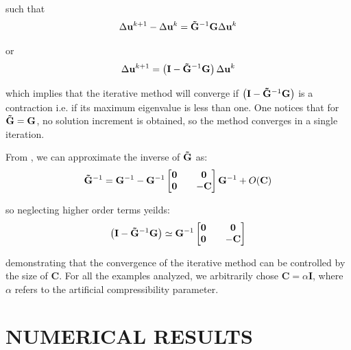 \documentclass{wccm2024}
\begin{document}
\noindent such that
\vskip -0.3cm
\begin{equation}
    \Delta\mathbf{u}^{k+1} - \Delta\mathbf{u}^{k} = \mathbf{\Tilde{G}}^{-1} \mathbf{G} \Delta\mathbf{u}^{k}
\end{equation}

\noindent or
\vskip -0.3cm
\begin{equation}
    \Delta\mathbf{u}^{k+1} = \left( \mathbf{I} - \mathbf{\Tilde{G}}^{-1} \mathbf{G} \right) \Delta\mathbf{u}^{k}
\end{equation}

\noindent which implies that the iterative method will converge if $\left( \mathbf{I} - \mathbf{\Tilde{G}}^{-1} \mathbf{G} \right)$ is a contraction i.e. if its maximum eigenvalue is less than one. One notices that for $\mathbf{\Tilde{G}} = \mathbf{G}$, no solution increment is obtained, so the method converges in a single iteration.

From \cite{gurtin1982introduction}, we can approximate the inverse of $\mathbf{\Tilde{G}}$ as:
\vskip -0.3cm
\begin{equation}
    \mathbf{\Tilde{G}}^{-1} = \mathbf{G}^{-1}-\mathbf{G}^{-1}
    \begin{bmatrix}
        \mathbf{0} && \mathbf{0} \\
        \mathbf{0} && -\mathbf{C}
    \end{bmatrix}
    \mathbf{G}^{-1} + O(\mathbf{C})
\end{equation}

\noindent so neglecting higher order terms yeilds:
\vskip -0.3cm
\begin{equation}
    \left( \mathbf{I} - \mathbf{\Tilde{G}}^{-1} \mathbf{G} \right) \simeq \mathbf{G}^{-1}
    \begin{bmatrix}
        \mathbf{0} && \mathbf{0} \\
        \mathbf{0} && -\mathbf{C}
    \end{bmatrix}
\end{equation}

\noindent demonstrating that the convergence of the iterative method can be controlled by the size of $\mathbf{C}$. For all the examples analyzed, we arbitrarily chose $\mathbf{C}=\alpha \mathbf{I}$, where $\alpha$ refers to the artificial compressibility parameter.

\section{NUMERICAL RESULTS}
\end{document}
